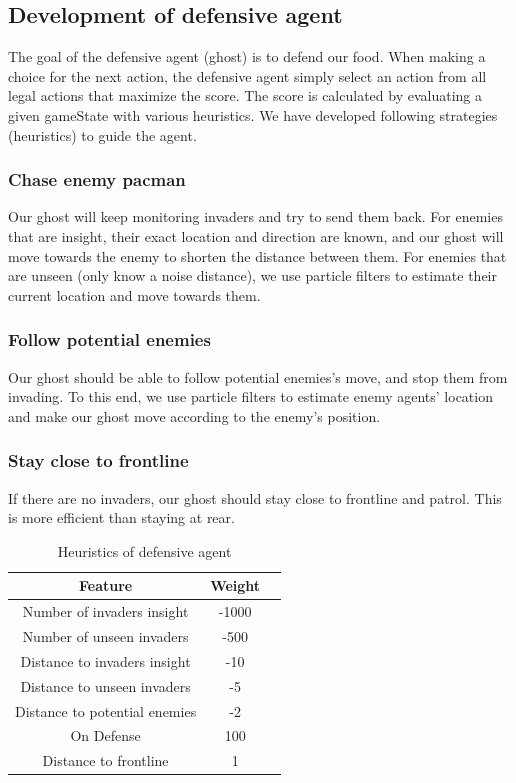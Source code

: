 \subsection{Development of defensive agent}
The goal of the defensive agent (ghost) is to defend our food. When making 
a choice for the next action, the defensive agent simply select an action 
from all legal actions that maximize the score. The score is calculated by 
evaluating a given gameState with various heuristics. We have developed 
following strategies (heuristics) to guide the agent.

\subsubsection{Chase enemy pacman}
Our ghost will keep monitoring invaders and try to send them back. For 
enemies that are insight, their exact location and direction are known, 
and our ghost will move towards the enemy to shorten the distance between 
them. For enemies that are unseen (only know a noise distance), we use 
particle filters to estimate their current location and move towards them.

\subsubsection{Follow potential enemies}
Our ghost should be able to follow potential enemies's move, and stop them 
from invading. To this end, we use particle filters to estimate enemy agents' 
location and make our ghost move according to the enemy's position.

\subsubsection{Stay close to frontline}
If there are no invaders, our ghost should stay close to frontline and patrol. 
This is more efficient than staying at rear.

\begin{table}[!htb]
  \caption{Heuristics of defensive agent}
  \label{2}
  \begin{tabular}{ccl}
    \toprule
    Feature&Weight\\
    \midrule
    Number of invaders insight & -1000\\
    Number of unseen invaders & -500\\
    Distance to invaders insight & -10\\
    Distance to unseen invaders & -5\\
    Distance to potential enemies & -2\\
    On Defense & 100\\
    Distance to frontline & 1\\
  \bottomrule
\end{tabular}
\end{table}

